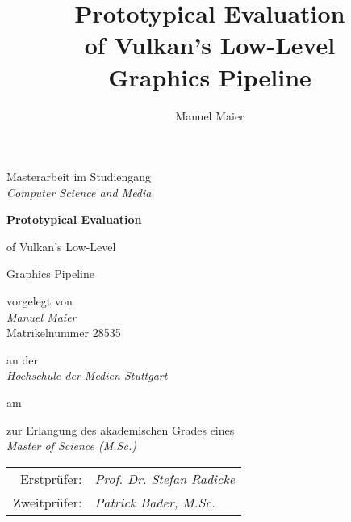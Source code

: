 \documentclass{scrreprt}
\begin{document}
  \pagestyle{plain.scrheadings}


  {
    \begin{titlepage}
      \begin{centering}

        \large

        Masterarbeit im Studiengang \\ \textit{\Large Computer Science and Media}

        \vspace{\fill}

        {\fontsize{2.4em}{0}\selectfont\bfseries
          Prototypical Evaluation \par of Vulkan's Low-Level \par Graphics Pipeline
        }

        \vspace{\fill}

        vorgelegt von \\ \textit{\Large Manuel Maier} \\ Matrikelnummer 28535

        an der \\ \textit{\Large Hochschule der Medien Stuttgart}

        am \\ \textit{\Large \DTMtoday}

        zur Erlangung des akademischen Grades eines \\ \textit{\Large Master of Science (M.Sc.)}


      \vspace{\fill}

      \begin{tabu}{rl}
        Erstprüfer:  & \textit{Prof. Dr. Stefan Radicke} \\
        Zweitprüfer: & \textit{Patrick Bader, M.Sc.}
      \end{tabu}

      \end{centering}
    \end{titlepage}
  }
  {
    \titlehead{}
    \subject{Master's Thesis \\ Computer Science and Media \\ Hochschule der Medien Stuttgart}
    \title{Prototypical Evaluation \\ of Vulkan's Low-Level \\ Graphics Pipeline}
    \author{Manuel Maier}
    \date{\DTMToday}
    \publishers
    {
      Supervisors \\
      \textbf{Prof. Dr. Stefan Radicke}\\
      \textbf{Patrick Bader, M.Sc.}
    }
    \maketitle
  }
\end{document}
